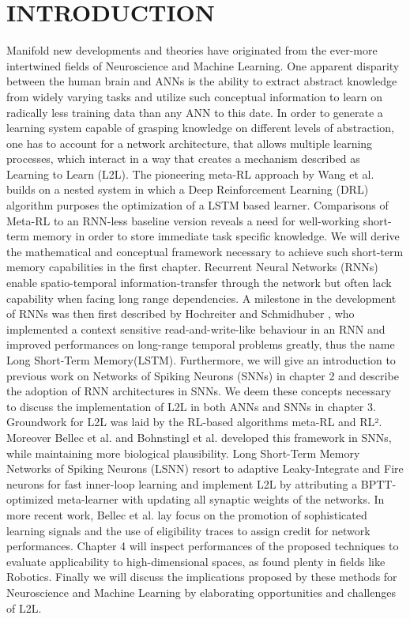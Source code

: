 \documentclass[letterpaper, 10 pt, conference]{ieeeconf}  %
\begin{document}
\section{INTRODUCTION}
Manifold new developments and theories have originated from the ever-more intertwined fields of Neuroscience and Machine Learning. One apparent 
disparity between the human brain and ANNs is the ability to extract abstract knowledge from widely varying tasks and utilize 
such conceptual information to learn on radically less training data than any ANN to this date. In order to generate
 a learning system capable of grasping knowledge on different levels of abstraction, one has to account for 
a network architecture, that allows multiple learning processes, which interact in a way that creates a mechanism described as Learning
to Learn (L2L). The pioneering meta-RL approach by Wang et al. \cite{wangLearningReinforcementLearn2016} builds on a nested system in which
a Deep Reinforcement Learning (DRL) algorithm purposes the optimization of a LSTM based learner. Comparisons of Meta-RL to an 
RNN-less baseline version reveals a need for well-working short-term memory in order to store immediate task specific knowledge.
We will derive the mathematical and conceptual framework necessary to achieve such short-term memory capabilities in the first chapter. Recurrent 
Neural Networks (RNNs) enable spatio-temporal information-transfer through the network but often lack capability when facing long range
dependencies. A milestone in the development of RNNs was then first described by Hochreiter and Schmidhuber \cite{hochreiterLongShortTermMemory1997},
who implemented a context sensitive read-and-write-like behaviour in an RNN and improved performances on long-range temporal problems greatly, thus 
the name Long Short-Term Memory(LSTM). Furthermore, we will give an introduction to previous work on Networks of Spiking Neurons (SNNs) 
in chapter 2 and describe the adoption of RNN architectures in SNNs. We deem these 
concepts necessary to discuss the implementation of L2L in both ANNs and SNNs in chapter 3. Groundwork for L2L was laid by the RL-based algorithms
meta-RL\cite{wangLearningReinforcementLearn2016} and RL²\cite{duanRLFastReinforcement2016}. Moreover Bellec et al. \cite{bellecLongShorttermMemory2018}
\cite{bellecBiologicallyInspiredAlternatives} and Bohnstingl et al. developed this framework in SNNs, while maintaining more biological plausibility. 
Long Short-Term Memory Networks of Spiking Neurons (LSNN) resort to adaptive Leaky-Integrate and Fire neurons for fast
inner-loop learning and implement L2L by attributing a BPTT-optimized meta-learner with updating all synaptic weights of the networks. 
In more recent work, Bellec et al. lay focus on the promotion of sophisticated learning signals and the use of eligibility traces to assign 
credit for network performances. Chapter 4 will inspect performances of the proposed techniques to evaluate applicability to high-dimensional 
spaces, as found plenty in fields like Robotics. Finally we will discuss the implications proposed by these methods for Neuroscience and
Machine Learning by elaborating opportunities and challenges of L2L.
\end{document}
